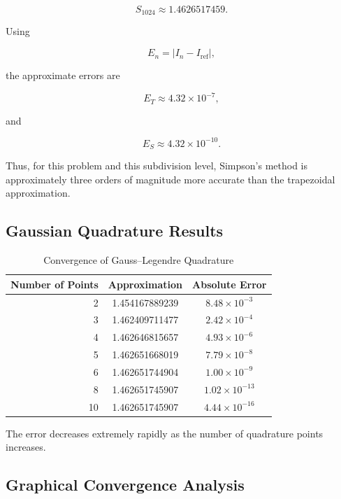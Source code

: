 \documentclass[11pt,a4paper]{article}
\begin{document}
\[
S_{1024}
\approx
1.4626517459.
\]

Using

\[
E_n=
|I_n-I_{\mathrm{ref}}|,
\]

the approximate errors are

\[
E_T
\approx
4.32\times10^{-7},
\]

and

\[
E_S
\approx
4.32\times10^{-10}.
\]

Thus, for this problem and this subdivision level, Simpson's method is
approximately three orders of magnitude more accurate than the
trapezoidal approximation.


\subsection{Gaussian Quadrature Results}

\begin{table}[H]
\centering
\caption{Convergence of Gauss--Legendre Quadrature}
\label{tab:gaussian}

\begin{tabular}{r|cc}
\toprule
\textbf{Number of Points}
& \textbf{Approximation}
& \textbf{Absolute Error} \\
\midrule
2  & 1.454167889239 & $8.48\times10^{-3}$ \\
3  & 1.462409711477 & $2.42\times10^{-4}$ \\
4  & 1.462646815657 & $4.93\times10^{-6}$ \\
5  & 1.462651668019 & $7.79\times10^{-8}$ \\
6  & 1.462651744904 & $1.00\times10^{-9}$ \\
8  & 1.462651745907 & $1.02\times10^{-13}$ \\
10 & 1.462651745907 & $4.44\times10^{-16}$ \\
\bottomrule
\end{tabular}
\end{table}

The error decreases extremely rapidly as the number of quadrature points
increases.


\subsection{Graphical Convergence Analysis}
\end{document}
